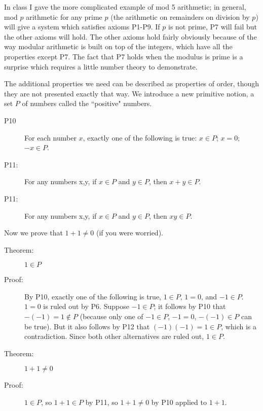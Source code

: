 \documentclass[12pt]{article}
\begin{document}
In class I gave the more complicated example of mod 5 arithmetic; in general, mod $p$ arithmetic for any prime $p$ (the arithmetic on remainders on division by $p$)
will give a system which satisfies axioms P1-P9.  If $p$ is not prime, P7 will fail but the other axioms will hold.  The other axioms hold fairly obviously because of the way modular arithmetic is built on top of the integers, which have all the properties except P7.  The fact that P7 holds when the modulus is prime is a surprise which requires a little number theory to demonstrate.

The additional properties we need can be described as properties of order, though they are not presented exactly that way.  We introduce a new primitive notion, a set $P$ of numbers called the ``positive" numbers.

\begin{description}

\item [P10]  For each number $x$, exactly one of the following is true:  $x \in P$; $x=0$; $-x \in P$.

\item[P11:]  For any numbers x,y, if $x \in P$ and $y \in P$, then $x+y \in P$.

\item[P11:]  For any numbers x,y, if $x \in P$ and $y \in P$, then $xy \in P$.

\end{description}

Now we prove that $1+1 \neq 0$ (if you were worried).

\begin{description}

\item[Theorem:]  $1 \in P$

\item[Proof:]  By P10, exactly one of the following is true, $1 \in P$, $1=0$, and $-1\in P$.  $1=0$ is ruled out by 
P6.  Suppose $-1\in P$; it follows by P10 that $-(-1)=1 \not\in P$ (because only one of $-1 \in P$, $-1=0$, $-(-1)\in P$ can be true).
But it also follows by P12 that $(-1)(-1)=1 \in P$, which is a contradiction.  Since both other alternatives are ruled out, $1 \in P$.

\item[Theorem:]  $1+1 \neq 0$

\item[Proof:]  $1 \in P$, so $1+1 \in P$ by P11, so $1+1 \neq 0$ by P10 applied to $1+1$.

\end{description}
\end{document}
